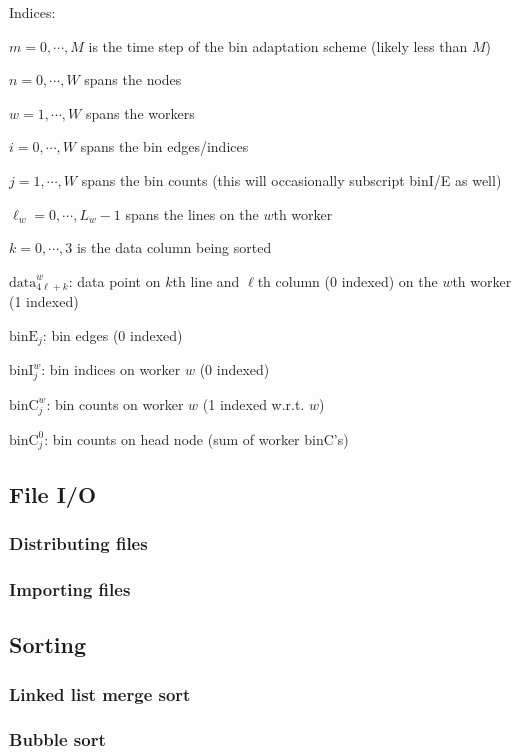 \documentclass{article}
\newenvironment{tight_enum}{
\begin{enumerate}[label=\alph*.]
\setlength{\itemsep}{0pt}
\setlength{\parskip}{0pt}
}{\end{enumerate}}
\begin{document}
Indices:
\begin{tight_enum}
	\item $m = 0, \cdots, M$ is the time step of the bin adaptation scheme (likely less than $M$)
	\item $n = 0, \cdots, W$ spans the nodes
	\item $w = 1, \cdots, W$ spans the workers
	\item $i = 0, \cdots, W$ spans the bin edges/indices
	\item $j = 1, \cdots, W$ spans the bin counts (this will occasionally subscript binI/E as well)
	\item $\ell_w = 0, \cdots, L_w-1$ spans the lines on the $w$th worker
	\item $k = 0, \cdots, 3$ is the data column being sorted
\end{tight_enum}

$\textrm{data}^w_{4\ell+k}$: data point on $k$th line and $\ell$th column (0 indexed) on the $w$th worker (1 indexed)

$\textrm{binE}_j$: bin edges (0 indexed)

$\textrm{binI}^w_j$: bin indices on worker $w$ (0 indexed)

$\textrm{binC}^w_j$: bin counts on worker $w$ (1 indexed w.r.t. $w$)

$\textrm{binC}^0_j$: bin counts on head node (sum of worker binC's)



\subsection{File I/O}
\subsubsection{Distributing files}
\subsubsection{Importing files}


\subsection{Sorting}
\subsubsection{Linked list merge sort}
\subsubsection{Bubble sort}
\end{document}

